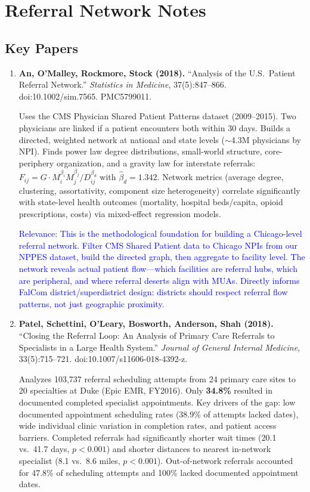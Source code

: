 \documentclass[11pt]{article}
\begin{document}
\bigskip


\section*{Referral Network Notes}

\subsection*{Key Papers}

\begin{enumerate}

\item \textbf{An, O'Malley, Rockmore, Stock (2018).} ``Analysis of the U.S.\ Patient Referral Network.'' \textit{Statistics in Medicine}, 37(5):847--866. doi:10.1002/sim.7565. PMC5799011.

Uses the CMS Physician Shared Patient Patterns dataset (2009--2015). Two physicians are linked if a patient encounters both within 30 days. Builds a directed, weighted network at national and state levels ($\sim$4.3M physicians by NPI). Finds power law degree distributions, small-world structure, core-periphery organization, and a gravity law for interstate referrals: $F_{ij} = G \cdot M_i^{\beta_i} M_j^{\beta_j} / D_{ij}^{\beta_d}$ with $\hat{\beta}_d = 1.342$. Network metrics (average degree, clustering, assortativity, component size heterogeneity) correlate significantly with state-level health outcomes (mortality, hospital beds/capita, opioid prescriptions, costs) via mixed-effect regression models.

\textcolor{blue}{Relevance: This is the methodological foundation for building a Chicago-level referral network. Filter CMS Shared Patient data to Chicago NPIs from our NPPES dataset, build the directed graph, then aggregate to facility level. The network reveals actual patient flow---which facilities are referral hubs, which are peripheral, and where referral deserts align with MUAs. Directly informs FalCom district/superdistrict design: districts should respect referral flow patterns, not just geographic proximity.}

\item \textbf{Patel, Schettini, O'Leary, Bosworth, Anderson, Shah (2018).} ``Closing the Referral Loop: An Analysis of Primary Care Referrals to Specialists in a Large Health System.'' \textit{Journal of General Internal Medicine}, 33(5):715--721. doi:10.1007/s11606-018-4392-z.

Analyzes 103,737 referral scheduling attempts from 24 primary care sites to 20 specialties at Duke (Epic EMR, FY2016). Only \textbf{34.8\%} resulted in documented completed specialist appointments. Key drivers of the gap: low documented appointment scheduling rates (38.9\% of attempts lacked dates), wide individual clinic variation in completion rates, and patient access barriers. Completed referrals had significantly shorter wait times (20.1 vs.\ 41.7 days, $p<0.001$) and shorter distances to nearest in-network specialist (8.1 vs.\ 8.6 miles, $p<0.001$). Out-of-network referrals accounted for 47.8\% of scheduling attempts and 100\% lacked documented appointment dates.


\end{enumerate}
\end{document}
